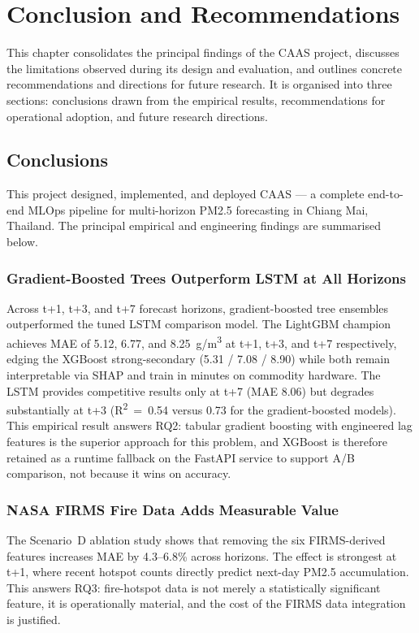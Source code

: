 \chapter{Conclusion and Recommendations}
\label{ch:conclusion}

This chapter consolidates the principal findings of the CAAS project,
discusses the limitations observed during its design and evaluation,
and outlines concrete recommendations and directions for future
research. It is organised into three sections: conclusions drawn from
the empirical results, recommendations for operational adoption, and
future research directions.

\section{Conclusions}

This project designed, implemented, and deployed CAAS --- a complete
end-to-end MLOps pipeline for multi-horizon PM2.5 forecasting in Chiang
Mai, Thailand. The principal empirical and engineering findings are
summarised below.

\subsection{Gradient-Boosted Trees Outperform LSTM at All Horizons}

Across t+1, t+3, and t+7 forecast horizons, gradient-boosted tree
ensembles outperformed the tuned LSTM comparison model. The LightGBM
champion achieves MAE of 5.12, 6.77, and 8.25~\textmu g/m\textsuperscript{3}
at t+1, t+3, and t+7 respectively, edging the XGBoost strong-secondary
(5.31 / 7.08 / 8.90) while both remain interpretable via SHAP and train
in minutes on commodity hardware. The LSTM provides competitive results
only at t+7 (MAE 8.06) but degrades substantially at t+3
(R\textsuperscript{2}~=~0.54 versus 0.73 for the gradient-boosted
models). This empirical result answers RQ2: tabular gradient boosting
with engineered lag features is the superior approach for this problem,
and XGBoost is therefore retained as a runtime fallback on the FastAPI
service to support A/B comparison, not because it wins on accuracy.

\subsection{NASA FIRMS Fire Data Adds Measurable Value}

The Scenario~D ablation study shows that removing the six FIRMS-derived
features increases MAE by 4.3--6.8\% across horizons. The effect is
strongest at t+1, where recent hotspot counts directly predict
next-day PM2.5 accumulation. This answers RQ3: fire-hotspot data is
not merely a statistically significant feature, it is operationally
material, and the cost of the FIRMS data integration is justified.

